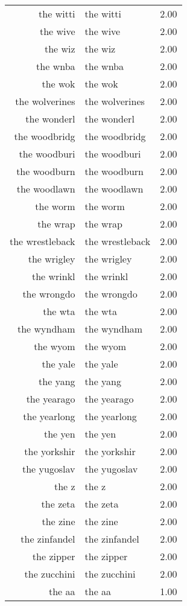 \begin{table}[ht]
\begin{tabular}{rlr}
  the witti & the witti & 2.00 \\ 
  the wive & the wive & 2.00 \\ 
  the wiz & the wiz & 2.00 \\ 
  the wnba & the wnba & 2.00 \\ 
  the wok & the wok & 2.00 \\ 
  the wolverines & the wolverines & 2.00 \\ 
  the wonderl & the wonderl & 2.00 \\ 
  the woodbridg & the woodbridg & 2.00 \\ 
  the woodburi & the woodburi & 2.00 \\ 
  the woodburn & the woodburn & 2.00 \\ 
  the woodlawn & the woodlawn & 2.00 \\ 
  the worm & the worm & 2.00 \\ 
  the wrap & the wrap & 2.00 \\ 
  the wrestleback & the wrestleback & 2.00 \\ 
  the wrigley & the wrigley & 2.00 \\ 
  the wrinkl & the wrinkl & 2.00 \\ 
  the wrongdo & the wrongdo & 2.00 \\ 
  the wta & the wta & 2.00 \\ 
  the wyndham & the wyndham & 2.00 \\ 
  the wyom & the wyom & 2.00 \\ 
  the yale & the yale & 2.00 \\ 
  the yang & the yang & 2.00 \\ 
  the yearago & the yearago & 2.00 \\ 
  the yearlong & the yearlong & 2.00 \\ 
  the yen & the yen & 2.00 \\ 
  the yorkshir & the yorkshir & 2.00 \\ 
  the yugoslav & the yugoslav & 2.00 \\ 
  the z & the z & 2.00 \\ 
  the zeta & the zeta & 2.00 \\ 
  the zine & the zine & 2.00 \\ 
  the zinfandel & the zinfandel & 2.00 \\ 
  the zipper & the zipper & 2.00 \\ 
  the zucchini & the zucchini & 2.00 \\ 
  the aa & the aa & 1.00 \\ 

\end{tabular}
\end{table}
